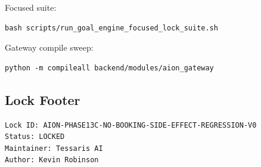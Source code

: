Focused suite:

\begin{verbatim}
bash scripts/run_goal_engine_focused_lock_suite.sh
\end{verbatim}

Gateway compile sweep:

\begin{verbatim}
python -m compileall backend/modules/aion_gateway
\end{verbatim}

\subsection{Lock Footer}

\begin{verbatim}
Lock ID: AION-PHASE13C-NO-BOOKING-SIDE-EFFECT-REGRESSION-V0
Status: LOCKED
Maintainer: Tessaris AI
Author: Kevin Robinson
\end{verbatim}
